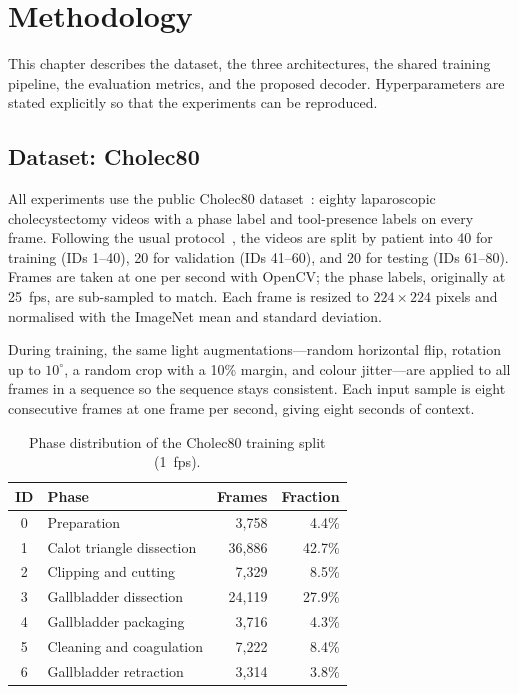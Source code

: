 \chapter{Methodology}

This chapter describes the dataset, the three architectures, the shared training pipeline, the evaluation metrics, and the proposed decoder. Hyperparameters are stated explicitly so that the experiments can be reproduced.

\section{Dataset: Cholec80}

All experiments use the public Cholec80 dataset~\cite{twinanda2017endonet}: eighty laparoscopic cholecystectomy videos with a phase label and tool-presence labels on every frame. Following the usual protocol~\cite{twinanda2017endonet,jin2018svrcnet,czempiel2020tecno,gao2021transsvnet}, the videos are split by patient into 40 for training (IDs 1--40), 20 for validation (IDs 41--60), and 20 for testing (IDs 61--80). Frames are taken at one per second with OpenCV; the phase labels, originally at 25~fps, are sub-sampled to match. Each frame is resized to $224 \times 224$ pixels and normalised with the ImageNet mean and standard deviation.

During training, the same light augmentations---random horizontal flip, rotation up to $10^\circ$, a random crop with a 10\% margin, and colour jitter---are applied to all frames in a sequence so the sequence stays consistent. Each input sample is eight consecutive frames at one frame per second, giving eight seconds of context.

\begin{table}[H]
\centering
\caption{Phase distribution of the Cholec80 training split (1~fps).}
\label{tab:phase_distribution}
\begin{tabular}{clrr}
\toprule
\textbf{ID} & \textbf{Phase} & \textbf{Frames} & \textbf{Fraction} \\
\midrule
0 & Preparation                & 3,758  & 4.4\% \\
1 & Calot triangle dissection  & 36,886 & 42.7\% \\
2 & Clipping and cutting       & 7,329  & 8.5\% \\
3 & Gallbladder dissection     & 24,119 & 27.9\% \\
4 & Gallbladder packaging      & 3,716  & 4.3\% \\
5 & Cleaning and coagulation   & 7,222  & 8.4\% \\
6 & Gallbladder retraction     & 3,314  & 3.8\% \\
\bottomrule
\end{tabular}
\end{table}

